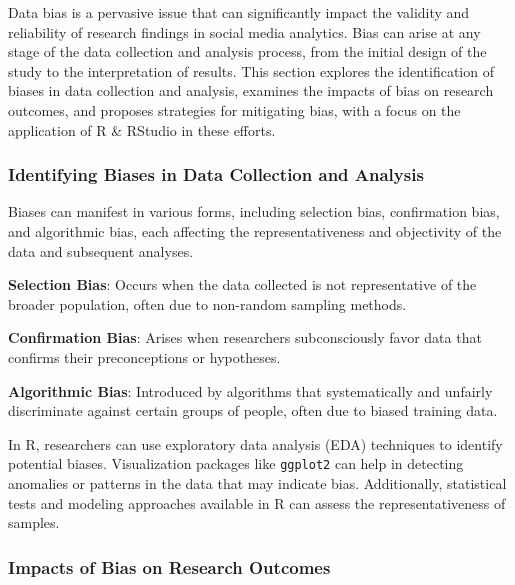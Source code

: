 \documentclass[
]{book}
\begin{document}
Data bias is a pervasive issue that can significantly impact the validity and reliability of research findings in social media analytics. Bias can arise at any stage of the data collection and analysis process, from the initial design of the study to the interpretation of results. This section explores the identification of biases in data collection and analysis, examines the impacts of bias on research outcomes, and proposes strategies for mitigating bias, with a focus on the application of R \& RStudio in these efforts.

\hypertarget{identifying-biases-in-data-collection-and-analysis}{%
\subsubsection*{Identifying Biases in Data Collection and Analysis}\label{identifying-biases-in-data-collection-and-analysis}}

Biases can manifest in various forms, including selection bias, confirmation bias, and algorithmic bias, each affecting the representativeness and objectivity of the data and subsequent analyses.

\textbf{Selection Bias}: Occurs when the data collected is not representative of the broader population, often due to non-random sampling methods.

\textbf{Confirmation Bias}: Arises when researchers subconsciously favor data that confirms their preconceptions or hypotheses.

\textbf{Algorithmic Bias}: Introduced by algorithms that systematically and unfairly discriminate against certain groups of people, often due to biased training data.

In R, researchers can use exploratory data analysis (EDA) techniques to identify potential biases. Visualization packages like \texttt{ggplot2} can help in detecting anomalies or patterns in the data that may indicate bias. Additionally, statistical tests and modeling approaches available in R can assess the representativeness of samples.

\hypertarget{impacts-of-bias-on-research-outcomes}{%
\subsubsection*{Impacts of Bias on Research Outcomes}\label{impacts-of-bias-on-research-outcomes}}
\end{document}
